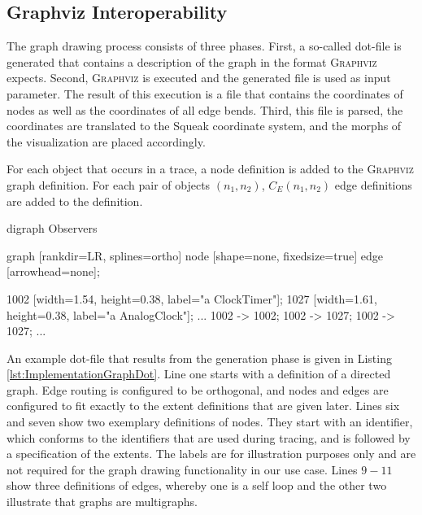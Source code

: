 \subsection{Graphviz Interoperability}

The graph drawing process consists of three phases.
First, a so-called dot-file is generated that contains a description of the graph in the format \textsc{Graphviz} expects.
Second, \textsc{Graphviz} is executed and the generated file is used as input parameter.
The result of this execution is a file that contains the coordinates of nodes as well as the coordinates of all edge bends.
Third, this file is parsed, the coordinates are translated to the Squeak coordinate system, and the morphs of the visualization are placed accordingly.

For each object that occurs in a trace, a node definition is added to the \textsc{Graphviz} graph definition.
For each pair of objects $(n_1, n_2)$, $C_E(n_1, n_2)$ edge definitions are added to the definition.

\begin{graphviz}[caption={Exemplary definition of a \textsc{Graphviz} graph, consisting of two nodes and three directed edges.}, label=lst:ImplementationGraphDot]
digraph Observers {
	graph [rankdir=LR, splines=ortho]
	node [shape=none, fixedsize=true]
	edge [arrowhead=none];
	
	1002 [width=1.54, height=0.38, label="a ClockTimer"];
	1027 [width=1.61, height=0.38, label="a AnalogClock"];
	...
	1002 -> 1002;
	1002 -> 1027;
	1002 -> 1027;
	...
}
\end{graphviz}

An example dot-file that results from the generation phase is given in Listing \ref{lst:ImplementationGraphDot}.
Line one starts with a definition of a directed graph.
Edge routing is configured to be orthogonal, and nodes and edges are configured to fit exactly to the extent definitions that are given later.
Lines six and seven show two exemplary definitions of nodes.
They start with an identifier, which conforms to the identifiers that are used during tracing, and is followed by a specification of the extents.
The labels are for illustration purposes only and are not required for the graph drawing functionality in our use case.
Lines $9-11$ show three definitions of edges, whereby one is a self loop and the other two illustrate that graphs are multigraphs.

